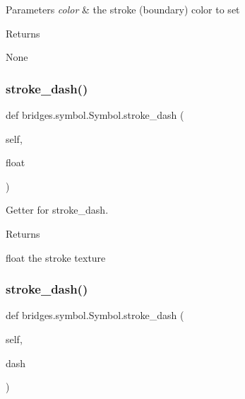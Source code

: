 \begin{DoxyParams}{Parameters}
{\em color} & the stroke (boundary) color to set \\
\hline
\end{DoxyParams}
\begin{DoxyReturn}{Returns}


None 
\end{DoxyReturn}
\mbox{\label{classbridges_1_1symbol_1_1_symbol_aeb388cf5a368e58ea10ecdd2ad7d3c10}} 
\subsubsection{\texorpdfstring{stroke\+\_\+dash()}{stroke\_dash()}\hspace{0.1cm}{\footnotesize\ttfamily [1/2]}}
{\footnotesize\ttfamily def bridges.\+symbol.\+Symbol.\+stroke\+\_\+dash (\begin{DoxyParamCaption}\item[{}]{self,  }\item[{}]{float }\end{DoxyParamCaption})}



Getter for stroke\+\_\+dash. 

\begin{DoxyReturn}{Returns}


float the stroke texture 
\end{DoxyReturn}
\mbox{\label{classbridges_1_1symbol_1_1_symbol_a1163b25841477c2fda6368fc05f4f79d}} 
\subsubsection{\texorpdfstring{stroke\+\_\+dash()}{stroke\_dash()}\hspace{0.1cm}{\footnotesize\ttfamily [2/2]}}
{\footnotesize\ttfamily def bridges.\+symbol.\+Symbol.\+stroke\+\_\+dash (\begin{DoxyParamCaption}\item[{}]{self,  }\item[{}]{dash }\end{DoxyParamCaption})}



